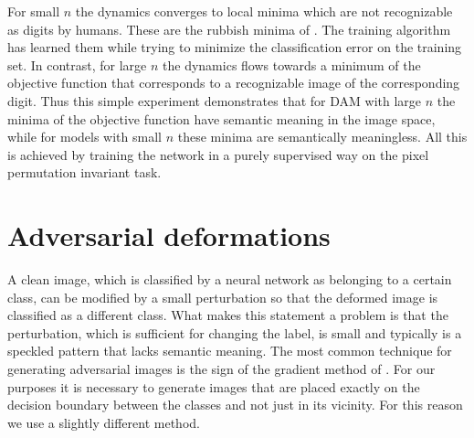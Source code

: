 \documentclass[12pt]{article} %
\begin{document}
For small $n$ the dynamics converges to local minima which are not recognizable as digits by humans. These are the rubbish minima of \cite{Nguyen}. The training algorithm has learned them while trying to minimize the classification error on the training set. In contrast, for large $n$ the dynamics flows towards a minimum of the objective function that corresponds to a recognizable image of the corresponding digit. Thus this simple experiment demonstrates that for DAM with large $n$ the minima of the objective function have semantic meaning in the image space, while for models with small $n$ these minima are semantically meaningless. All this is achieved by training the network in a purely supervised way on the pixel permutation invariant task.

\section{Adversarial deformations}\label{adversarial deformation section}
A clean image, which is classified by a neural network as belonging to a certain class, can be modified by a small perturbation so that the deformed image is classified as a different class. What makes this statement a problem is that the perturbation, which is sufficient for changing the label, is small and typically is a speckled pattern that lacks semantic meaning. The most common technique for generating adversarial images is the sign of the gradient method of \cite{sign gradient}. For our purposes it is necessary to generate images that are placed exactly on the decision boundary between the classes and not just in its vicinity. For this reason we use a slightly different method. 
\end{document}
